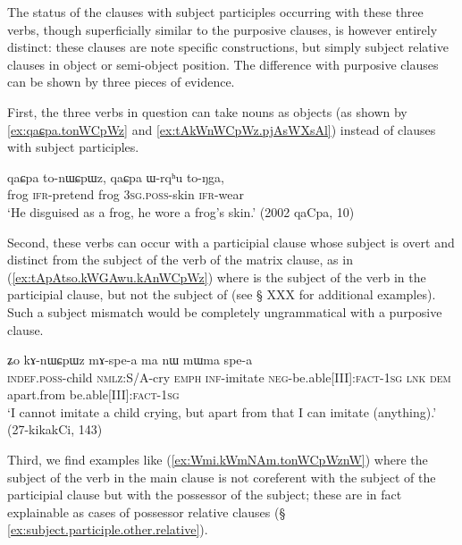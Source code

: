 The status of the clauses with subject participles occurring with these three verbs, though superficially similar to the purposive clauses, is however entirely distinct: these clauses are note specific constructions, but simply subject relative clauses in object or semi-object position. The difference with purposive clauses can be shown by three pieces of evidence. 

First, the three verbs in question can take nouns as objects (as shown by \ref{ex:qaɕpa.tonWCpWz} and \ref{ex:tAkWnWCpWz.pjAsWXsAl}) instead of clauses with subject participles. 

\begin{exe}
\ex \label{ex:qaɕpa.tonWCpWz}
 \gll  qaɕpa to-nɯɕpɯz, qaɕpa ɯ-rqʰu to-ŋga, \\
frog \textsc{ifr}-pretend frog \textsc{3sg}.\textsc{poss}-skin \textsc{ifr}-wear \\
\glt `He disguised as a frog, he wore a frog's skin.' (2002 qaCpa, 10)
\end{exe}
 
 Second, these verbs can occur with a participial clause whose subject is overt and distinct from the subject of the verb of the matrix clause, as in (\ref{ex:tApAtso.kWGAwu.kAnWCpWz}) where   is the subject of the verb  in the participial clause, but not the subject of   (see § XXX for additional examples). Such a subject mismatch would be completely ungrammatical with a purposive clause.
 
\begin{exe}
\ex \label{ex:tApAtso.kWGAwu.kAnWCpWz}
  ʑo kɤ-nɯɕpɯz mɤ-spe-a ma nɯ mɯma spe-a \\
 \textsc{indef}.\textsc{poss}-child \textsc{nmlz}:S/A-cry \textsc{emph} \textsc{inf}-imitate \textsc{neg}-be.able[III]:\textsc{fact}-\textsc{1sg} \textsc{lnk} \textsc{dem} apart.from be.able[III]:\textsc{fact}-\textsc{1sg} \\
\glt `I cannot imitate a child crying, but apart from that I can imitate (anything).' (27-kikakCi, 143)
\end{exe}

Third, we find examples like (\ref{ex:Wmi.kWmNAm.tonWCpWznW}) where the subject of the verb in the main clause is not coreferent with the subject of the participial clause but with the possessor of the subject; these are in fact explainable as cases of possessor relative clauses (§ \ref{ex:subject.participle.other.relative}).

